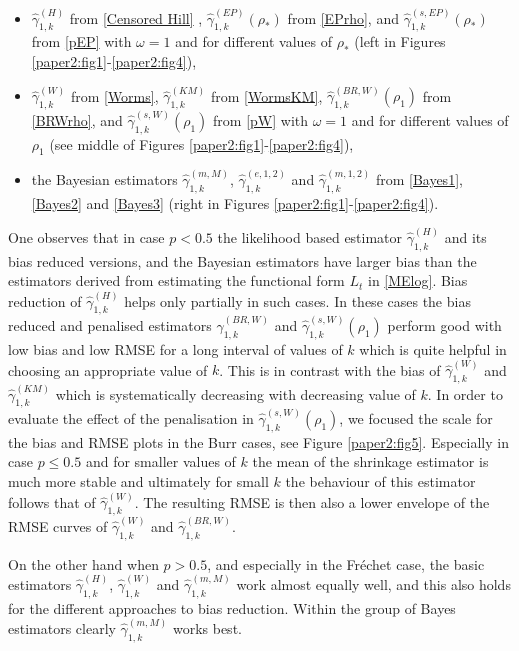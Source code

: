\begin{itemize}
\item $\hat{\gamma}_{1,k}^{(H)}$ from \eqref{Censored Hill} , $\hat{\gamma}_{1,k}^{(EP)}(\rho_*)$ from \eqref{EPrho}, and $\hat{\gamma}_{1,k}^{(s,EP)}(\rho_*)$ from \eqref{pEP} with $\omega=1$ and for different values of $\rho_*$ (left in Figures \ref{paper2:fig1}-\ref{paper2:fig4}),
\item $\hat{\gamma}_{1,k}^{(W)}$ from \eqref{Worms}, $\hat{\gamma}_{1,k}^{(KM)}$ from \eqref{WormsKM}, $\hat{\gamma}_{1,k}^{(BR,W)}(\rho_1)$ from \eqref{BRWrho}, and $\hat{\gamma}_{1,k}^{(s,W)}(\rho_1)$ from \eqref{pW} with $\omega=1$ and for different values of $\rho_1$ (see middle of Figures \ref{paper2:fig1}-\ref{paper2:fig4}),
\item the Bayesian estimators $\hat{\gamma}_{1,k}^{(m,M)}$, $\hat{\gamma}_{1,k}^{(e,1,2)}$ and $\hat{\gamma}_{1,k}^{(m,1,2)}$ from \eqref{Bayes1}, \eqref{Bayes2} and \eqref{Bayes3} (right in Figures \ref{paper2:fig1}-\ref{paper2:fig4}).
\end{itemize}

\vspace{0.3cm}
One observes that in case $p<0.5$ the likelihood based estimator $\hat{\gamma}_{1,k}^{(H)}$ and its bias reduced versions, and the Bayesian estimators have larger bias than the estimators derived from estimating the functional form $L_t$ in \eqref{MElog}. Bias reduction of $\hat{\gamma}_{1,k}^{(H)}$ helps only partially in such cases. 
In these cases the bias reduced and penalised estimators $\hat{\gamma}_{1,k}^{(BR,W)}$ and $\hat{\gamma}_{1,k}^{(s,W)}(\rho_1)$ perform good with low bias and low RMSE for a long interval of values of $k$ which is quite helpful in choosing an appropriate value of $k$. This is in contrast with the bias of $\hat{\gamma}_{1,k}^{(W)}$ and $\hat{\gamma}_{1,k}^{(KM)}$ which is systematically decreasing with decreasing value of $k$. In order to evaluate the effect of the penalisation in $\hat{\gamma}_{1,k}^{(s,W)}(\rho_1)$, we focused the scale for the bias and RMSE plots in the Burr cases, see Figure \ref{paper2:fig5}. Especially in case $p \leq 0.5$ and for smaller values of $k$ the mean of the shrinkage estimator is much more stable and ultimately for small $k$ the behaviour of this estimator follows that of $\hat{\gamma}_{1,k}^{(W)}$. The resulting RMSE is then also a lower envelope of the RMSE curves of $\hat{\gamma}_{1,k}^{(W)}$ and  $\hat{\gamma}_{1,k}^{(BR,W)}$.

\vspace{0.3cm}
On the other hand when $p>0.5$, and especially in the Fr\'echet case, the basic estimators $\hat{\gamma}_{1,k}^{(H)}$, $\hat{\gamma}_{1,k}^{(W)}$ and $\hat{\gamma}_{1,k}^{(m,M)}$ work almost equally well, and this also holds for the different approaches to bias reduction. Within the group of Bayes estimators clearly $\hat{\gamma}_{1,k}^{(m,M)}$ works best.

